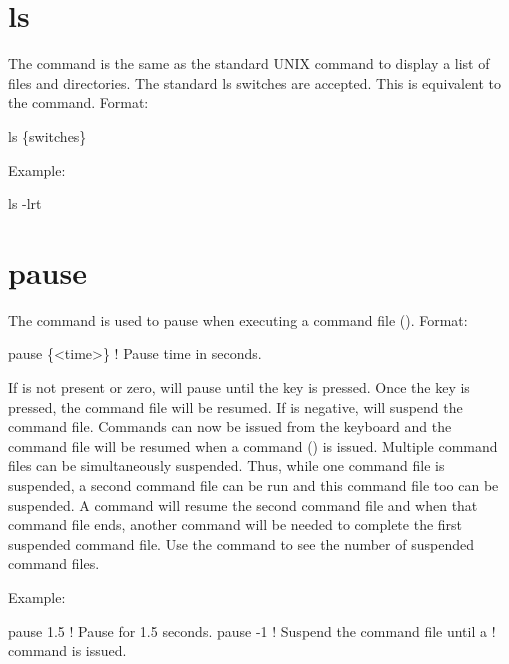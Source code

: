\section{ls}
\label{s:ls}

The  command is the same as the standard UNIX  command to display a list of files and
directories. The standard ls switches are accepted. This is equivalent to the  command.
Format:
\begin{example}
  ls \{switches\}
\end{example}

Example:
\begin{example}
  ls -lrt
\end{example}

\section{pause}
\label{s:pause}

The  command is used to pause \tao when executing a command file
(). Format:
\begin{example}
  pause \{<time>\} ! Pause time in seconds.
\end{example}

\vskip 10pt
If  is not present or zero, \tao will pause until the  key is pressed. Once the
 key is pressed, the command file will be resumed. If  is negative, \tao will
suspend the command file. Commands can now be issued from the keyboard and the command file will be
resumed when a  command () is issued. Multiple command files can be
simultaneously suspended.  Thus, while one command file is suspended, a second command file can be
run and this command file too can be suspended. A  command will resume the second
command file and when that command file ends, another  command will be needed to
complete the first suspended command file. Use the  command to see the number of
suspended command files.

Example:
\begin{example}
  pause 1.5    ! Pause for 1.5 seconds.
  pause -1     ! Suspend the command file until a  
               !   command is issued.
\end{example}


